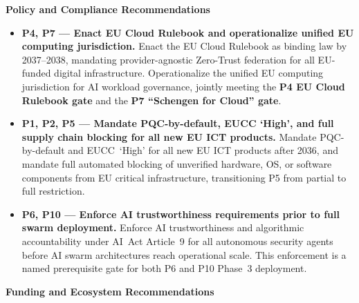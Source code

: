 \textbf{Policy and Compliance Recommendations}

\begin{itemize}

    \item \textbf{P4, P7 --- Enact EU Cloud Rulebook and operationalize
    unified EU computing jurisdiction.}
    Enact the EU Cloud Rulebook as binding law by 2037--2038, mandating
    provider-agnostic Zero-Trust federation for all EU-funded digital
    infrastructure. Operationalize the unified EU computing jurisdiction
    for AI workload governance, jointly meeting the
    \textbf{P4 EU Cloud Rulebook gate} and the
    \textbf{P7 ``Schengen for Cloud'' gate}.

    \item \textbf{P1, P2, P5 --- Mandate PQC-by-default, EUCC `High',
    and full supply chain blocking for all new EU ICT products.}
    Mandate PQC-by-default and EUCC~`High' for all new EU ICT products
    after 2036, and mandate full automated blocking of unverified
    hardware, OS, or software components from EU critical
    infrastructure, transitioning P5 from partial to full restriction.

    \item \textbf{P6, P10 --- Enforce AI trustworthiness requirements
    prior to full swarm deployment.}
    Enforce AI trustworthiness and algorithmic accountability under
    AI~Act Article~9 for all autonomous security agents before AI
    swarm architectures reach operational scale. This enforcement is
    a named prerequisite gate for both P6 and P10 Phase~3 deployment.

\end{itemize}

\textbf{Funding and Ecosystem Recommendations}

